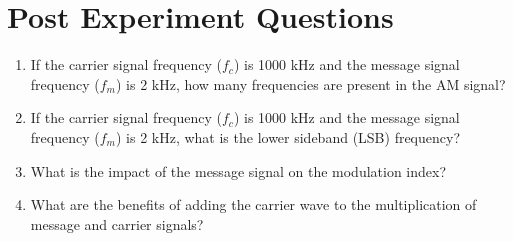\section*{Post Experiment Questions}
\begin{enumerate}
    \item If the carrier signal frequency ($f_c$) is 1000 kHz and the message signal frequency ($f_m$) is
    2 kHz, how many frequencies are present in the AM signal?
    \item If the carrier signal frequency ($f_c$) is 1000 kHz and the message signal frequency ($f_m$) is
    2 kHz, what is the lower sideband (LSB) frequency?
    \item What is the impact of the message signal on the modulation index?
    \item What are the benefits of adding the carrier wave to the multiplication of message and
    carrier signals?
\end{enumerate}